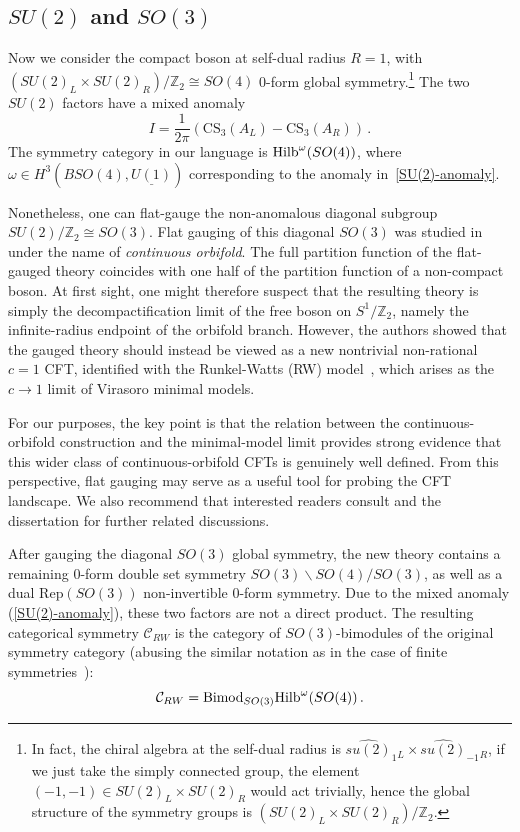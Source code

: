 \documentclass[a4paper,11pt]{article}
\newcommand{\be}{\begin{equation}}
\newcommand{\ee}{\end{equation}}
\def\mb{\mathbb}
\def\mc{\mathcal}
\def\hilb{{\rm Hilb}}
\begin{document}
\subsection{$SU(2)$ and $SO(3)$}

Now we consider the compact boson at self-dual radius $R=1$, with $(SU(2)_L\times SU(2)_R)/\mb{Z}_2\cong SO(4)$ 0-form global symmetry.\footnote{In fact, the chiral algebra at the self-dual radius is $\widehat{su(2)}_1{}_L \times \widehat{su(2)}_{-1}{}_R$, if we just take the simply connected group, the element $(-1,-1)\in SU(2)_L\times SU(2)_R$ would act trivially, hence the global structure of the symmetry groups is $(SU(2)_L\times SU(2)_R)/\mb{Z}_2$.} The two $SU(2)$ factors have a mixed anomaly
\be
\label{SU(2)-anomaly}
I=\frac{1}{2\pi}\left(\mathrm{CS}_3(A_L)-\mathrm{CS}_3(A_R)\right)\,.
\ee
The symmetry category in our language is $\hilb^\omega(SO(4))$, where $\omega\in H^3(BSO(4),\underline{U(1)})$ corresponding to the anomaly in~\eqref{SU(2)-anomaly}.



Nonetheless, one can flat-gauge the non-anomalous diagonal subgroup $SU(2)/\mb{Z}_2\cong SO(3)$. Flat gauging of this diagonal $SO(3)$ was studied in~\cite{Gaberdiel:2011aa} under the name of \emph{continuous orbifold}. The full partition function of the flat-gauged theory coincides with one half of the partition function of a non-compact boson. At first sight, one might therefore suspect that the resulting theory is simply the decompactification limit of the free boson on $S^1/\mathbb Z_2$, namely the infinite-radius endpoint of the orbifold branch. However, the authors showed that the gauged theory should instead be viewed as a new nontrivial non-rational $c=1$ CFT, identified with the Runkel-Watts (RW) model~\cite{Runkel:2001ng}, which arises as the $c\to 1$ limit of Virasoro minimal models.

For our purposes, the key point is that the relation between the continuous-orbifold construction and the minimal-model limit provides strong evidence that this wider class of continuous-orbifold CFTs is genuinely well defined. From this perspective, flat gauging may serve as a useful tool for probing the CFT landscape. We also recommend that interested readers consult \cite{Roggenkamp:2003qp} and the dissertation \cite{Restuccia:2013tba} for further related discussions.


After gauging the diagonal $SO(3)$ global symmetry, the new theory contains a remaining 0-form double set symmetry $SO(3)\backslash SO(4)/SO(3)$, as well as a dual Rep$(SO(3))$ non-invertible 0-form symmetry. Due to the mixed anomaly (\ref{SU(2)-anomaly}), these two factors are not a direct product. The resulting categorical symmetry $\mc{C}_{RW}$ is the category of $SO(3)$-bimodules of the original symmetry category (abusing the similar notation as in the case of finite symmetries~\cite{Bhardwaj:2017xup,Tachikawa:2017gyf}):
\be
\mc{C}_{RW}=\mathrm{Bimod}_{SO(3)}\hilb^\omega(SO(4))\,.
\ee
\end{document}
